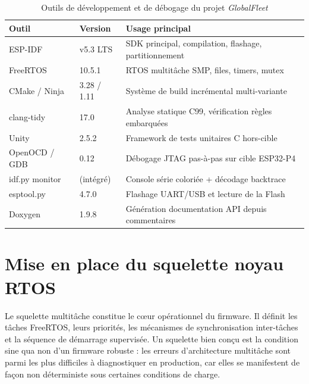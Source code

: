 \begin{table}[H]
\centering
\renewcommand{\arraystretch}{1.5}
\caption{Outils de développement et de débogage du projet \textit{GlobalFleet}}
\label{tab:devtools}
\small
\begin{tabular}{|p{3.0cm}|p{2.5cm}|p{6.0cm}|}
\hline
\rowcolor{gray!20}
\textbf{Outil} & \textbf{Version} & \textbf{Usage principal} \\
\hline
ESP-IDF         & v5.3 LTS    & SDK principal, compilation, flashage, partitionnement \\
\hline
FreeRTOS        & 10.5.1      & RTOS multitâche SMP, files, timers, mutex \\
\hline
CMake / Ninja   & 3.28 / 1.11 & Système de build incrémental multi-variante \\
\hline
clang-tidy      & 17.0        & Analyse statique C99, vérification règles embarquées \\
\hline
Unity           & 2.5.2       & Framework de tests unitaires C hors-cible \\
\hline
OpenOCD / GDB   & 0.12        & Débogage JTAG pas-à-pas sur cible ESP32-P4 \\
\hline
idf.py monitor  & (intégré)   & Console série coloriée + décodage backtrace \\
\hline
esptool.py      & 4.7.0       & Flashage UART/USB et lecture de la Flash \\
\hline
Doxygen         & 1.9.8       & Génération documentation API depuis commentaires \\
\hline
\end{tabular}
\end{table}

\section{Mise en place du squelette noyau RTOS}
\label{sec:skeleton}

Le squelette multitâche constitue le cœur opérationnel du firmware.
Il définit les tâches FreeRTOS, leurs priorités, les mécanismes de
synchronisation inter-tâches et la séquence de démarrage supervisée.
Un squelette bien conçu est la condition sine qua non d'un firmware
robuste : les erreurs d'architecture multitâche sont parmi les plus
difficiles à diagnostiquer en production, car elles se manifestent
de façon non déterministe sous certaines conditions de charge.

